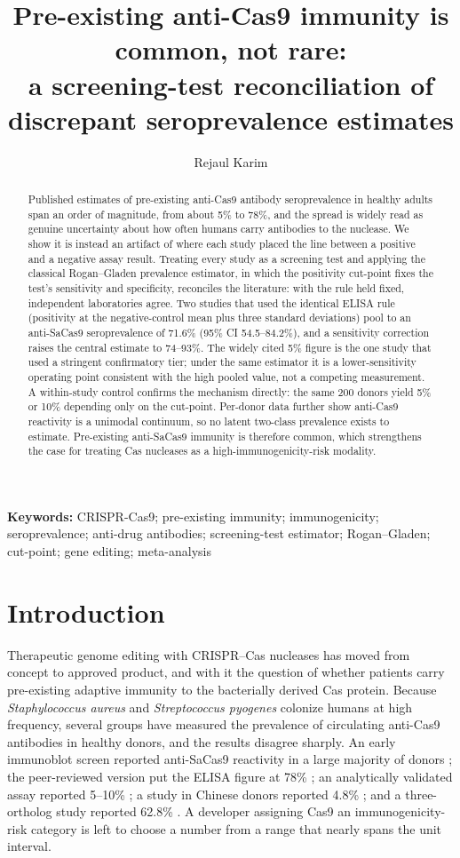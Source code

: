 \documentclass[11pt]{article}
\title{\textbf{Pre-existing anti-Cas9 immunity is common, not rare:\\ a screening-test reconciliation of discrepant seroprevalence estimates}}
\author[1,2,*]{Rejaul Karim}
\affil[1]{Campbellsville University, Campbellsville, Kentucky, USA}
\affil[2]{Independent Researcher}
\affil[*]{Correspondence: karimrej@msu.edu}
\date{}
\begin{document}
\maketitle

\begin{abstract}
\noindent Published estimates of pre-existing anti-Cas9 antibody seroprevalence in healthy adults span an order of magnitude, from about 5\% to 78\%, and the spread is widely read as genuine uncertainty about how often humans carry antibodies to the nuclease. We show it is instead an artifact of where each study placed the line between a positive and a negative assay result. Treating every study as a screening test and applying the classical Rogan--Gladen prevalence estimator, in which the positivity cut-point fixes the test's sensitivity and specificity, reconciles the literature: with the rule held fixed, independent laboratories agree. Two studies that used the identical ELISA rule (positivity at the negative-control mean plus three standard deviations) pool to an anti-SaCas9 seroprevalence of 71.6\% (95\% CI 54.5--84.2\%), and a sensitivity correction raises the central estimate to 74--93\%. The widely cited 5\% figure is the one study that used a stringent confirmatory tier; under the same estimator it is a lower-sensitivity operating point consistent with the high pooled value, not a competing measurement. A within-study control confirms the mechanism directly: the same 200 donors yield 5\% or 10\% depending only on the cut-point. Per-donor data further show anti-Cas9 reactivity is a unimodal continuum, so no latent two-class prevalence exists to estimate. Pre-existing anti-SaCas9 immunity is therefore common, which strengthens the case for treating Cas nucleases as a high-immunogenicity-risk modality.
\end{abstract}

\noindent\textbf{Keywords:} CRISPR-Cas9; pre-existing immunity; immunogenicity; seroprevalence; anti-drug antibodies; screening-test estimator; Rogan--Gladen; cut-point; gene editing; meta-analysis

\section{Introduction}
Therapeutic genome editing with CRISPR--Cas nucleases has moved from concept to approved product, and with it the question of whether patients carry pre-existing adaptive immunity to the bacterially derived Cas protein. Because \textit{Staphylococcus aureus} and \textit{Streptococcus pyogenes} colonize humans at high frequency, several groups have measured the prevalence of circulating anti-Cas9 antibodies in healthy donors, and the results disagree sharply. An early immunoblot screen reported anti-SaCas9 reactivity in a large majority of donors \citep{charlesworth2018}; the peer-reviewed version put the ELISA figure at 78\% \citep{charlesworth2019}; an analytically validated assay reported 5--10\% \citep{simhadri2018}; a study in Chinese donors reported 4.8\% \citep{shen2022}; and a three-ortholog study reported 62.8\% \citep{simhadri2026}. A developer assigning Cas9 an immunogenicity-risk category is left to choose a number from a range that nearly spans the unit interval.
\end{document}
